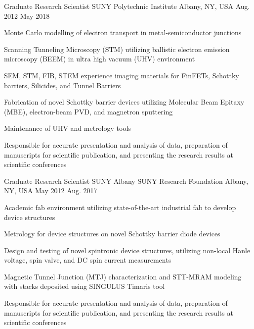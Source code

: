 \begin{cventries}
\cventry%
{Graduate Research Scientist} %
{SUNY Polytechnic Institute} %
{Albany, NY, USA} %
{Aug. 2012 \textendash{} May 2018} %
{
  \begin{cvitems} %
    \item {Monte Carlo modelling of electron transport in metal-semiconductor junctions}
    \item {Scanning Tunneling Microscopy (STM) utilizing ballistic electron emission microscopy (BEEM) in ultra high vacuum (UHV) environment}
    \item {SEM, STM, FIB, STEM experience imaging materials for FinFETs, Schottky barriers, Silicides, and Tunnel Barriers}
    \item {Fabrication of novel Schottky barrier devices utilizing Molecular Beam Epitaxy (MBE), electron-beam PVD, and magnetron sputtering}
    \item {Maintenance of UHV and metrology tools}
    \item {Responsible for accurate presentation and analysis of data, preparation of manuscripts for scientific publication, and presenting the research results at scientific conferences}
  \end{cvitems}
}

\cventry%
{Graduate Research Scientist} %
{SUNY Albany \textendash{} SUNY Research Foundation} %
{Albany, NY, USA} %
{May 2012 \textendash{} Aug. 2017} %
{
  \begin{cvitems} %
    \item {Academic fab environment utilizing state-of-the-art industrial fab to develop device structures}
    \item {Metrology for device structures on novel Schottky barrier diode devices}
    \item {Design and testing of novel spintronic device structures, utilizing non-local Hanle voltage, spin valve, and DC spin current measurements}
    \item {Magnetic Tunnel Junction (MTJ) characterization and STT-MRAM modeling with stacks deposited using SINGULUS Timaris tool}
    \item {Responsible for accurate presentation and analysis of data, preparation of manuscripts for scientific publication, and presenting the research results at scientific conferences}
  \end{cvitems}
}


\end{cventries}
